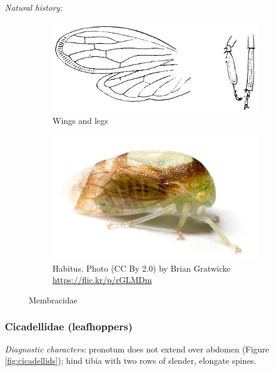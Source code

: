 \documentclass[letterpaper, 11pt]{article}
\begin{document}
\noindent{}\textit{Natural history:} \\

\begin{figure}[ht!]
 \centering
 \begin{subfigure}[ht!]{0.45\textwidth}
  \includegraphics[width=\textwidth]{MembracidWings}
  \caption{Wings and legs \citep[][Plate I, Figs. 4c,4e]{bhl79792}}
  \label{fig:membrac1}
 \end{subfigure}
 \qquad
 \begin{subfigure}[ht!]{0.45\textwidth}
  \includegraphics[width=\textwidth]{MembracidHabitus}
  \caption{Habitus. Photo (CC By 2.0) by Brian Gratwicke \url{https://flic.kr/p/rGLMDm}}
  \label{fig:membrac2}
 \end{subfigure}
 \caption{Membracidae}\label{fig:membracid}
\end{figure}

\subsubsection{Cicadellidae (leafhoppers)}
\noindent{}\textit{Diagnostic characters:} pronotum does not extend over abdomen (Figure \ref{fig:cicadellids}); hind tibia with two rows of slender, elongate spines.\\
\end{document}
